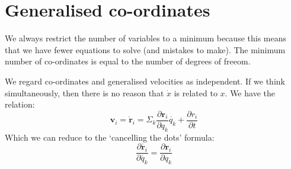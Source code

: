 \section{Generalised co-ordinates}

We always restrict the number of variables to a minimum because this means that
we have fewer equations to solve (and mistakes to make). The minimum number of
co-ordinates is equal to the number of degrees of freeom.

We regard co-ordinates and generalised velocities as independent. If we think
simultaneously, then there is no reason that $\dot{x}$ is related to $x$. We
have the relation:
$$
	\bm{v}_i = \dot{\bm{r}}_i = \Sigma_k \frac{\partial \bm{r}_i}{\partial q_k}
	\dot{q_k} + \frac{\partial r_i}{\partial t}
$$
Which we can reduce to the `cancelling the dots' formula:
$$
	\frac{\partial \dot{\bm{r}_i}}{\partial \dot{q_k}} =
	\frac{\partial \bm{r}_i}{\partial q_k}
$$
